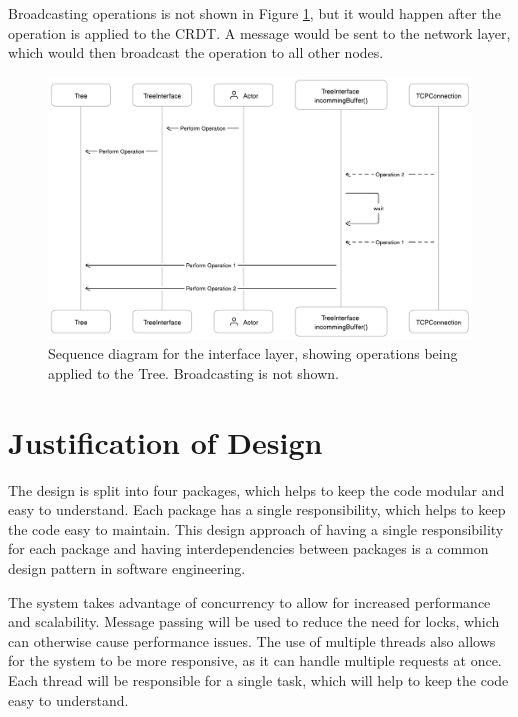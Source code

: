 \documentclass[12pt]{report}
\begin{document}
Broadcasting operations is not shown in Figure \ref{fig:interfaceseq}, but it would happen after the operation is applied to the CRDT. A message would be sent to the network layer, which would then broadcast the operation to all other nodes. \par

\begin{figure}[h]
    \centering
    \includegraphics[width=1\textwidth]{images/treeinterface.png}
    \caption{Sequence diagram for the interface layer, showing operations being applied to the Tree. Broadcasting is not shown.}
    \label{fig:interfaceseq}
\end{figure}


\section{Justification of Design}
The design is split into four packages, which helps to keep the code modular and easy to understand. Each package has a single responsibility, which helps to keep the code easy to maintain. This design approach of having a single responsibility for each package and having interdependencies between packages is a common design pattern in software engineering. \par

The system takes advantage of concurrency to allow for increased performance and scalability. Message passing will be used to reduce the need for locks, which can otherwise cause performance issues. The use of multiple threads also allows for the system to be more responsive, as it can handle multiple requests at once. Each thread will be responsible for a single task, which will help to keep the code easy to understand. \par
\end{document}
